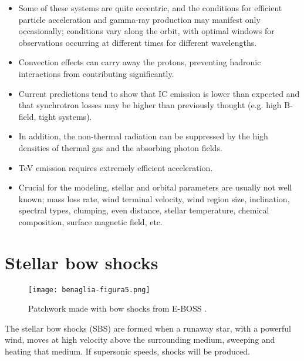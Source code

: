 \documentclass[baaa]{baaa}
\begin{document}
\begin{itemize}

\item Some of these systems are quite eccentric, and the conditions for efficient particle acceleration and gamma-ray production may manifest only occasionally; conditions vary along the orbit, with optimal windows for observations occurring at different times for different wavelengths. 

\item Convection effects can carry away the protons, preventing hadronic interactions from contributing significantly.

\item Current predictions \citep{delpalacio2016,reitberger2017,pittard2021} tend to show that IC emission is lower than expected and that synchrotron losses may be higher than previously thought (e.g. high B-field, tight systems).

\item In addition, the non-thermal radiation can be suppressed by the high densities of thermal gas and the absorbing photon fields.

\item TeV emission requires extremely efficient acceleration.

\item Crucial for the modeling, stellar and orbital parameters are usually not well known; mass loss rate, wind terminal velocity, wind region size, inclination, spectral types, clumping, even distance, stellar temperature, chemical composition, surface magnetic field, etc.

\end{itemize}


\section{Stellar bow shocks}\label{sect:bowshocks}


\begin{figure*}[!t]
\centering
\texttt{[image: benaglia-figura5.png]}
\caption{Patchwork made with bow shocks from E-BOSS \citep[see][for full details]{peri2015}.}
\label{fig:eboss}
\end{figure*}

The stellar bow shocks (SBS) are formed when a runaway star, with a powerful wind, moves at high velocity above the surrounding medium, sweeping and heating that medium. If supersonic speeds, shocks will be produced.
\end{document}
